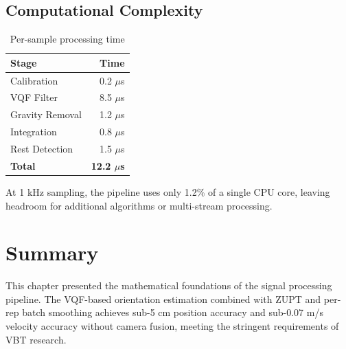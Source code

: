 \subsection{Computational Complexity}

\begin{table}[h]
    \centering
    \caption{Per-sample processing time}
    \label{tab:processing_time}
    \begin{tabular}{lr}
        \toprule
        \textbf{Stage} & \textbf{Time} \\
        \midrule
        Calibration & 0.2 $\mu$s \\
        VQF Filter & 8.5 $\mu$s \\
        Gravity Removal & 1.2 $\mu$s \\
        Integration & 0.8 $\mu$s \\
        Rest Detection & 1.5 $\mu$s \\
        \midrule
        \textbf{Total} & \textbf{12.2 $\mu$s} \\
        \bottomrule
    \end{tabular}
\end{table}

At 1 kHz sampling, the pipeline uses only 1.2\% of a single CPU core, leaving headroom for additional algorithms or multi-stream processing.

\section{Summary}

This chapter presented the mathematical foundations of the signal processing pipeline. The VQF-based orientation estimation combined with ZUPT and per-rep batch smoothing achieves sub-5 cm position accuracy and sub-0.07 m/s velocity accuracy without camera fusion, meeting the stringent requirements of VBT research.

\newpage